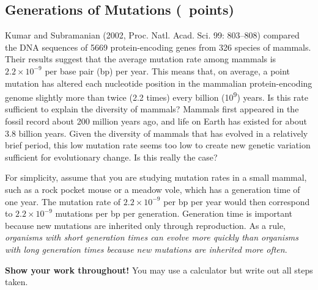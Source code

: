 \documentclass[11pt, addpoints]{exam}
\begin{document}
\subsection*{Generations of Mutations (\numpoints\ points)}

Kumar and Subramanian (2002, Proc. Natl. Acad. Sci. 99: 803--808) compared 
the DNA sequences of 5669 protein-encoding genes from 326 species of mammals. 
Their results suggest that the average mutation rate among mammals is $2.2 \times
10^{-9}$ per base pair (bp) per year. This means that, on average, a 
point mutation has altered each nucleotide position in the mammalian protein-encoding 
genome slightly more than twice (2.2 times) every billion (10\textsuperscript{9}) 
years. Is this rate sufficient to explain the diversity of mammals? Mammals first 
appeared in the fossil record about 200 million years ago, and life on Earth has
existed for about 3.8 billion years. Given the diversity of mammals that has evolved 
in a relatively brief period, this low mutation rate seems too low to create new genetic 
variation sufficient for evolutionary change. Is this really the case?

For simplicity, assume that you are studying mutation rates in a small mammal, such 
as a rock pocket mouse or a meadow vole, which has a generation time of one year. 
The mutation rate of $2.2 \times 10^{-9}$ per bp per year would then 
correspond to $2.2 \times 10^{-9}$ mutations per bp per generation. 
Generation time is important because new mutations are inherited only through 
reproduction. As a rule, \emph{organisms with short generation times can evolve more 
quickly than organisms with long generation times because new mutations are inherited 
more often}.

\vspace{\baselineskip}

\noindent \textbf{Show your work throughout!} You may use a calculator but write out all steps taken.
\end{document}
